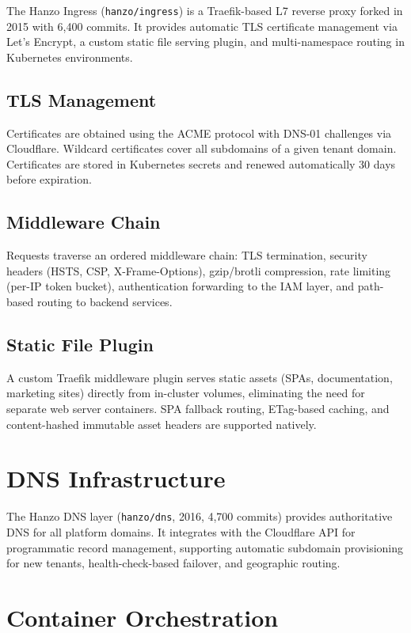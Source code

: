 \documentclass[11pt,a4paper]{article}
\begin{document}
The Hanzo Ingress (\texttt{hanzo/ingress}) is a Traefik-based L7 reverse proxy forked in 2015 with 6{,}400 commits. It provides automatic TLS certificate management via Let's Encrypt, a custom static file serving plugin, and multi-namespace routing in Kubernetes environments.

\subsection{TLS Management}

Certificates are obtained using the ACME protocol with DNS-01 challenges via Cloudflare. Wildcard certificates cover all subdomains of a given tenant domain. Certificates are stored in Kubernetes secrets and renewed automatically 30 days before expiration.

\subsection{Middleware Chain}

Requests traverse an ordered middleware chain: TLS termination, security headers (HSTS, CSP, X-Frame-Options), gzip/brotli compression, rate limiting (per-IP token bucket), authentication forwarding to the IAM layer, and path-based routing to backend services.

\subsection{Static File Plugin}

A custom Traefik middleware plugin serves static assets (SPAs, documentation, marketing sites) directly from in-cluster volumes, eliminating the need for separate web server containers. SPA fallback routing, ETag-based caching, and content-hashed immutable asset headers are supported natively.

\section{DNS Infrastructure}

The Hanzo DNS layer (\texttt{hanzo/dns}, 2016, 4{,}700 commits) provides authoritative DNS for all platform domains. It integrates with the Cloudflare API for programmatic record management, supporting automatic subdomain provisioning for new tenants, health-check-based failover, and geographic routing.

\section{Container Orchestration}
\end{document}
